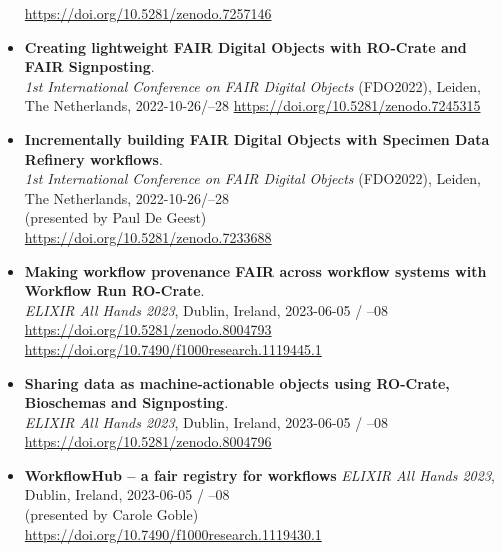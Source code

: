 \begin{itemize}
    \url{https://doi.org/10.5281/zenodo.7257146}
  \item
    \textbf{Creating lightweight FAIR Digital Objects with RO-Crate and
    FAIR Signposting}.\\
    \emph{1st International Conference on FAIR Digital Objects} (FDO2022),
    Leiden, The Netherlands, 2022-10-26/--28
    \url{https://doi.org/10.5281/zenodo.7245315}
  \item
    \textbf{Incrementally building FAIR Digital Objects with Specimen Data
    Refinery workflows}.\\
    \emph{1st International Conference on FAIR Digital Objects} (FDO2022),
    Leiden, The Netherlands, 2022-10-26/--28\\
    (presented by Paul De Geest)\\
    \url{https://doi.org/10.5281/zenodo.7233688}
  \item
    \textbf{Making workflow provenance FAIR across workflow systems with
    Workflow Run RO-Crate}.\\
    \emph{ELIXIR All Hands 2023}, Dublin, Ireland, 2023-06-05 / --08\\
    \url{https://doi.org/10.5281/zenodo.8004793}~\\
    \url{https://doi.org/10.7490/f1000research.1119445.1}
  \item
    \textbf{Sharing data as machine-actionable objects using RO-Crate,
    Bioschemas and Signposting}.\\
    \emph{ELIXIR All Hands 2023}, Dublin, Ireland, 2023-06-05 / --08\\
    \url{https://doi.org/10.5281/zenodo.8004796}
  \item
    \textbf{WorkflowHub -- a fair registry for workflows} \emph{ELIXIR All
    Hands 2023}, Dublin, Ireland, 2023-06-05 / --08\\
    (presented by Carole Goble)\\
    \url{https://doi.org/10.7490/f1000research.1119430.1}
    
\end{itemize}
  
